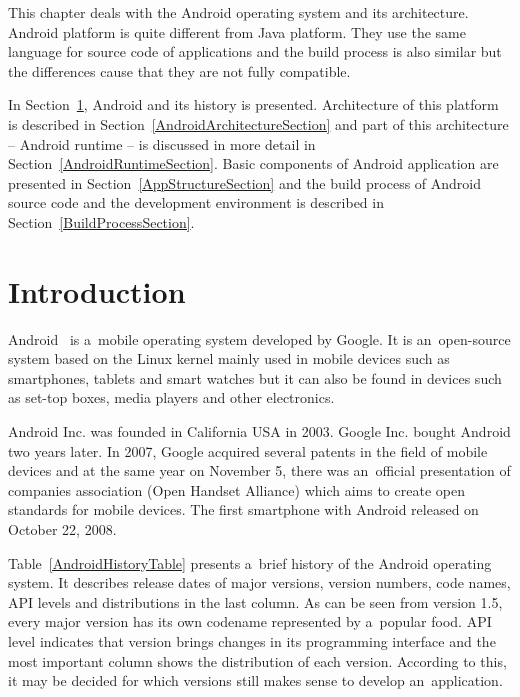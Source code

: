This chapter deals with the Android operating system and its architecture. Android platform is quite different from
Java platform. They use the same language for source code of applications and the build process is also similar but the
differences cause that they are not fully compatible.

In Section~\ref{AndroidIntroductionSection}, Android and its history is presented. Architecture of this platform is
described in Section~\ref{AndroidArchitectureSection} and part of this architecture -- Android runtime -- is discussed
in more detail in Section~\ref{AndroidRuntimeSection}. Basic components of Android application are presented in
Section~\ref{AppStructureSection} and the build process of Android source code and the development environment is
described in Section~\ref{BuildProcessSection}.

\section{Introduction}\label{AndroidIntroductionSection}
Android~\cite{AndroidBook, AndroidProgBook} is a~mobile operating system developed by Google. It is an~open-source
system based on the Linux kernel mainly used in mobile devices such as smartphones, tablets and smart watches but it can
also be found in devices such as set-top boxes, media players and other electronics.

Android Inc. was founded in California USA in 2003. Google Inc. bought Android two years later. In 2007, Google acquired
several patents in the field of mobile devices and at the same year on November 5, there was an~official presentation
of companies association (Open Handset Alliance) which aims to create open standards for mobile devices. The first
smartphone with Android released on October 22, 2008.

Table~\ref{AndroidHistoryTable} presents a~brief history of the Android operating system. It describes release dates of
major versions, version numbers, code names, API levels and distributions in the last column. As can be seen from
version 1.5, every major version has its own codename represented by a~popular food. API level indicates that version
brings changes in its programming interface and the most important column shows the distribution of each version.
According to this, it may be decided for which versions still makes sense to develop an~application.

